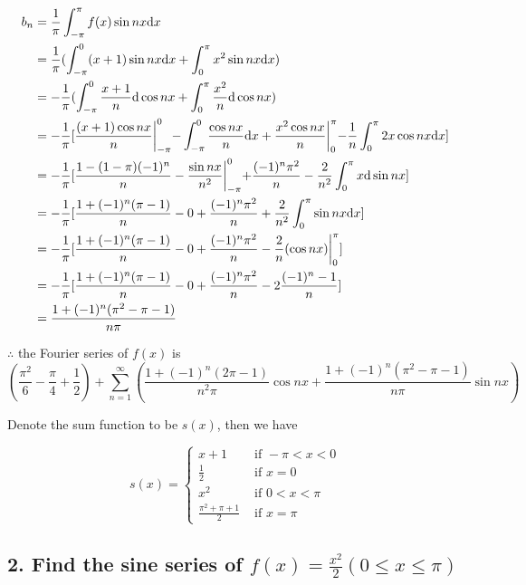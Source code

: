 \documentclass{article}
\begin{document}
    $$\begin{aligned}
        b_n &= \frac 1 \pi \int_{-\pi}^\pi f(x) \sin nx \textrm dx \\
        &= \frac 1 \pi (\int_{-\pi}^0 (x+1)\sin nx \textrm dx + \int_0^\pi x^2\sin nx \textrm dx) \\
        &= -\frac 1 \pi (\int_{-\pi}^0 \frac{x+1}{n}\textrm d\cos nx + \int_0^\pi \frac{x^2}{n} \textrm d\cos nx) \\
        &= -\frac 1 \pi [\frac{(x+1)\cos nx}{n}\biggl|_{-\pi}^0 - \int_{-\pi}^0 \frac{\cos nx}{n} \textrm dx + \frac{x^2 \cos nx}{n}\biggl|_0^\pi - \frac 1 n \int_0^\pi 2x \cos nx \textrm dx] \\
        &= -\frac 1 \pi [\frac{1 - (1-\pi)(-1)^n}{n} - \frac{\sin nx}{n^2}\biggl|_{-\pi}^0 + \frac{(-1)^n \pi^2}{n} - \frac{2}{n^2} \int_0^\pi x \textrm d\sin nx] \\
        &= -\frac 1 \pi [\frac{1 + (-1)^n(\pi - 1)}{n} - 0 + \frac{(-1)^n \pi^2}{n} + \frac{2}{n^2}\int_0^\pi \sin nx \textrm dx] \\
        &= -\frac 1 \pi [\frac{1 + (-1)^n(\pi - 1)}{n} - 0 + \frac{(-1)^n \pi^2}{n} - \frac{2}{n}(\cos nx)\biggl|_0^\pi] \\
        &= -\frac 1 \pi [\frac{1 + (-1)^n(\pi - 1)}{n} - 0 + \frac{(-1)^n \pi^2}{n} - 2\frac{(-1)^n - 1}{n}] \\
        &= \frac{1 + (-1)^n(\pi^2 -\pi - 1)}{n\pi}
    \end{aligned}$$

    $\therefore$ the Fourier series of $f(x)$ is $$(\frac{\pi^2}{6} - \frac{\pi}{4} + \frac 1 2) + \sum_{n=1}^\infty ( \frac{1 + (-1)^n(2\pi - 1)}{n^2\pi}\cos nx + \frac{1 + (-1)^n(\pi^2 -\pi - 1)}{n\pi}\sin nx)$$

    Denote the sum function to be $s(x)$, then we have

    $$s(x) = \left\{ \begin{array}{ll} 
        x + 1 &\textrm{ if } -\pi < x < 0 \\
        \frac 1 2 &\textrm{ if } x = 0 \\
        x^2 & \textrm{ if } 0 < x < \pi \\
        \frac{\pi^2 + \pi + 1}{2} &\textrm{ if } x = \pi
    \end{array}\right.$$

    \subsection*{2. Find the sine series of $f(x) = \frac{x^2}{2}(0 \leq x \leq \pi)$}
\end{document}
